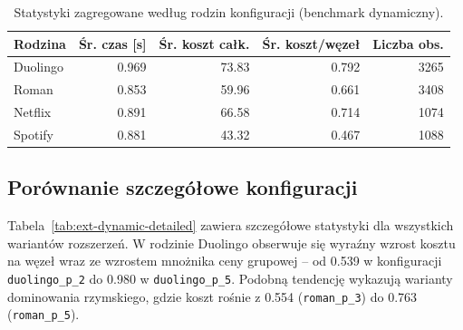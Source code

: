 \begin{table}[H]
  \centering
  \caption{Statystyki zagregowane według rodzin konfiguracji (benchmark dynamiczny).}
  \label{tab:ext-dynamic-family}
  \begin{tabular}{lrrrr}
    \toprule
    \textbf{Rodzina} & \textbf{Śr. czas [s]} & \textbf{Śr. koszt całk.} & \textbf{Śr. koszt/węzeł} & \textbf{Liczba obs.} \\
    \midrule
    Duolingo         & 0.969                 & 73.83                    & 0.792                    & 3265                 \\
    Roman            & 0.853                 & 59.96                    & 0.661                    & 3408                 \\
    Netflix          & 0.891                 & 66.58                    & 0.714                    & 1074                 \\
    Spotify          & 0.881                 & 43.32                    & 0.467                    & 1088                 \\
    \bottomrule
  \end{tabular}
\end{table}

\subsection{Porównanie szczegółowe konfiguracji}

Tabela~\ref{tab:ext-dynamic-detailed} zawiera szczegółowe statystyki dla wszystkich wariantów rozszerzeń. W rodzinie Duolingo obserwuje się wyraźny wzrost kosztu na węzeł wraz ze wzrostem mnożnika ceny grupowej -- od 0.539 w konfiguracji \texttt{duolingo\_p\_2} do 0.980 w \texttt{duolingo\_p\_5}. Podobną tendencję wykazują warianty dominowania rzymskiego, gdzie koszt rośnie z 0.554 (\texttt{roman\_p\_3}) do 0.763 (\texttt{roman\_p\_5}).

